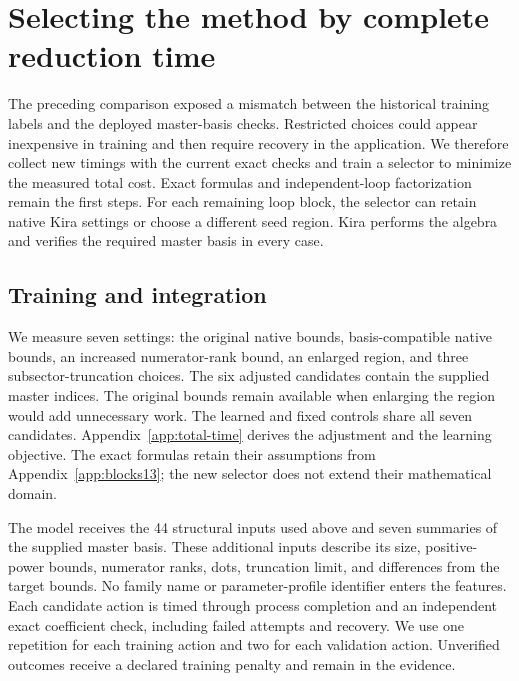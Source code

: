 \section{Selecting the method by complete reduction time}
\label{sec:total-time}
The preceding comparison exposed a mismatch between the historical training labels and the deployed master-basis checks. Restricted choices could appear inexpensive in training and then require recovery in the application. We therefore collect new timings with the current exact checks and train a selector to minimize the measured total cost. Exact formulas and independent-loop factorization remain the first steps. For each remaining loop block, the selector can retain native Kira settings or choose a different seed region. Kira performs the algebra and verifies the required master basis in every case.

\subsection{Training and integration}
We measure seven settings: the original native bounds, basis-compatible native bounds, an increased numerator-rank bound, an enlarged region, and three subsector-truncation choices. The six adjusted candidates contain the supplied master indices. The original bounds remain available when enlarging the region would add unnecessary work. The learned and fixed controls share all seven candidates. Appendix~\ref{app:total-time} derives the adjustment and the learning objective. The exact formulas retain their assumptions from Appendix~\ref{app:blocks13}; the new selector does not extend their mathematical domain.

The model receives the 44 structural inputs used above and seven summaries of the supplied master basis. These additional inputs describe its size, positive-power bounds, numerator ranks, dots, truncation limit, and differences from the target bounds. No family name or parameter-profile identifier enters the features. Each candidate action is timed through process completion and an independent exact coefficient check, including failed attempts and recovery. We use one repetition for each training action and two for each validation action. Unverified outcomes receive a declared training penalty and remain in the evidence.

